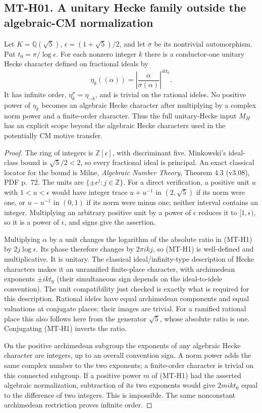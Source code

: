 \subsection*{MT-H01. A unitary Hecke family outside the algebraic-CM normalization}
Let $K=\mathbb Q(\sqrt5)$, $\epsilon=(1+\sqrt5)/2$, and let $\sigma$
be its nontrivial automorphism. Put $t_0=\pi/\log\epsilon$.
For each nonzero integer $k$ there is a conductor-one unitary Hecke
character defined on fractional ideals by
\[
       \eta_k((\alpha))=
       \left|\frac{\alpha}{\sigma(\alpha)}\right|^{ik t_0}.
                                                               \tag{MT-H1}
\]
It has infinite order, $\eta_k^\sigma=\eta_{-k}$, and is trivial
on the rational ideles. No positive power of $\eta_k$ becomes an
algebraic Hecke character after multiplying by a complex norm power
and a finite-order character. Thus the full unitary-Hecke input $M_H$
has an explicit scope beyond the algebraic Hecke characters used in
the potentially CM motive transfer.

\begin{proof}
The ring of integers is $\mathbb Z[\epsilon]$, with discriminant five.
Minkowski's ideal-class bound is $\sqrt5/2<2$, so every fractional
ideal is principal. An exact classical locator for the bound is
Milne, \emph{Algebraic Number Theory}, Theorem 4.3 (v3.08), PDF p.~72.
The units are $\{\pm\epsilon^j:j\in\mathbb Z\}$. For a direct
verification, a positive unit $u$ with $1<u<\epsilon$ would have
integer trace $u+u^{-1}$ in $(2,\sqrt5)$ if its norm were one, or
$u-u^{-1}$ in $(0,1)$ if its norm were minus one; neither interval
contains an integer. Multiplying an arbitrary positive unit by a
power of $\epsilon$ reduces it to $[1,\epsilon)$, so it is a power
of $\epsilon$, and signs give the assertion.

Multiplying $\alpha$ by a unit changes the logarithm of the absolute
ratio in (MT-H1) by $2j\log\epsilon$. Its phase therefore changes by
$2\pi i k j$, so (MT-H1) is well-defined and multiplicative. It is
unitary. The classical ideal/infinity-type description of Hecke
characters makes it an unramified finite-place character, with
archimedean exponents $\pm ikt_0$ (their simultaneous sign depends
on the ideal-to-idele convention). The unit compatibility just checked
is exactly what is required for this description. Rational ideles
have equal archimedean components and equal valuations at conjugate
places; their images are trivial. For a ramified rational place this
also follows here from the generator $\sqrt5$, whose absolute ratio
is one. Conjugating (MT-H1) inverts the ratio.

On the positive archimedean subgroup the exponents of any algebraic
Hecke character are integers, up to an overall convention sign.
A norm power adds the same complex number to the two exponents;
a finite-order character is trivial on this connected subgroup.
If a positive power $m$ of (MT-H1) had the asserted algebraic
normalization, subtraction of its two exponents would give
$2mikt_0$ equal to the difference of two integers. This is impossible.
The same nonconstant archimedean restriction proves infinite order.
\end{proof}

